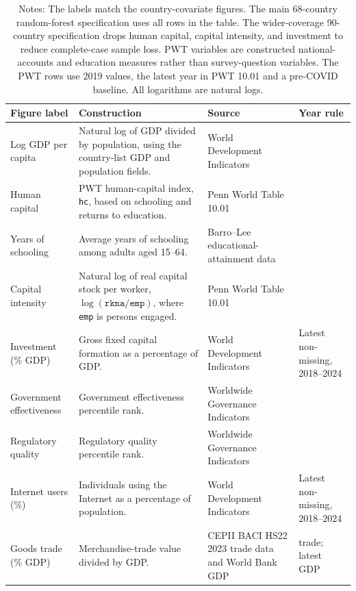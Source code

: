\begin{table}[!htbp]
\centering
\footnotesize
\caption{Country covariates used in the country-covariate screens.}
\label{tab:appendix_country_covariate_dictionary}
\begin{tabularx}{\textwidth}{>{\raggedright\arraybackslash}p{}>{\raggedright\arraybackslash}X>{\raggedright\arraybackslash}p{}>{\raggedright\arraybackslash}p{}}
\toprule
Figure label & Construction & Source & Year rule \\
\midrule
Log GDP per capita & Natural log of GDP divided by population, using the country-list GDP and population fields. & World Development Indicators \citep{worldbank_wdi} & 2024 \\
Human capital & PWT human-capital index, \texttt{hc}, based on schooling and returns to education. & Penn World Table 10.01 \citep{FeenstraInklaarTimmer2015PWT} & 2019 \\
Years of schooling & Average years of schooling among adults aged 15--64. & Barro--Lee educational-attainment data \citep{BarroLee2013Education} & 2015 \\
Capital intensity & Natural log of real capital stock per worker, \(\log(\texttt{rkna}/\texttt{emp})\), where \texttt{emp} is persons engaged. & Penn World Table 10.01 \citep{FeenstraInklaarTimmer2015PWT} & 2019 \\
Investment (\% GDP) & Gross fixed capital formation as a percentage of GDP. & World Development Indicators \citep{worldbank_wdi} & Latest non-missing, 2018--2024 \\
Government effectiveness & Government effectiveness percentile rank. & Worldwide Governance Indicators \citep{worldbank_wgi} & 2024 \\
Regulatory quality & Regulatory quality percentile rank. & Worldwide Governance Indicators \citep{worldbank_wgi} & 2024 \\
Internet users (\%) & Individuals using the Internet as a percentage of population. & World Development Indicators \citep{worldbank_wdi} & Latest non-missing, 2018--2024 \\
Goods trade (\% GDP) & Merchandise-trade value divided by GDP. & CEPII BACI HS22 2023 trade data \citep{GaulierZignago2010BACI} and World Bank GDP \citep{worldbank_wdi} & 2023 trade; latest GDP \\
\bottomrule
\end{tabularx}
\caption*{\scriptsize Notes: The labels match the country-covariate figures. The main 68-country random-forest specification uses all rows in the table. The wider-coverage 90-country specification drops human capital, capital intensity, and investment to reduce complete-case sample loss. PWT variables are constructed national-accounts and education measures rather than survey-question variables. The PWT rows use 2019 values, the latest year in PWT 10.01 and a pre-COVID baseline. All logarithms are natural logs.}
\end{table}
